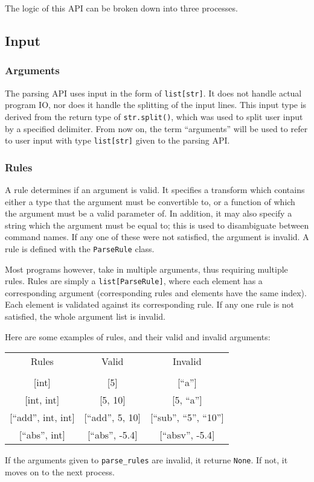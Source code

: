 \documentclass{article}
\begin{document}
		The logic of this API can be broken down into three processes.

		\subsection{Input}
			\subsubsection{Arguments}
				The parsing API uses input in the form of \verb|list[str]|. It does not handle
				actual program IO, nor does it handle the splitting of the input lines. This
				input type is derived from the return type of \verb|str.split()|, which was
				used to split user input by a specified delimiter. From now on, the term
				``arguments'' will be used to refer to user input with type \verb|list[str]|
				given to the parsing API\@.

			\subsubsection{Rules}
				A rule determines if an argument is valid. It specifies a transform which contains
				either a type that the argument must be convertible to, or a function of which the
				argument must be a valid parameter of. In addition, it may also specify a string
				which the argument must be equal to; this is used to disambiguate between command
				names. If any one of these were not satisfied, the argument is invalid. A rule is
				defined with the \verb|ParseRule| class.

				Most programs however, take in multiple arguments, thus requiring multiple rules.
				Rules are simply a \verb|list[ParseRule]|, where each element has a corresponding
				argument (corresponding rules and elements have the same index). Each element is
				validated against its corresponding rule. If any one rule is not satisfied, the
				whole argument list is invalid.

				Here are some examples of rules, and their valid and invalid arguments:

				\begin{center}
					\begin{tabular}{c c c}
						Rules & Valid & Invalid \\
						\\
						{[int]} & {[5]} & {[``a'']} \\
						{[int, int]} & {[5, 10]} & {[5, ``a'']} \\
						{[``add'', int, int]} & {[``add'', 5, 10]} & {[``sub'', ``5'', ``10'']} \\
						{[``abs'', int]} & {[``abs'', -5.4]} & {[``absv'', -5.4]} \\
					\end{tabular}
				\end{center}

				If the arguments given to \verb|parse_rules| are invalid, it returne \verb|None|.
				If not, it moves on to the next process.
\end{document}
